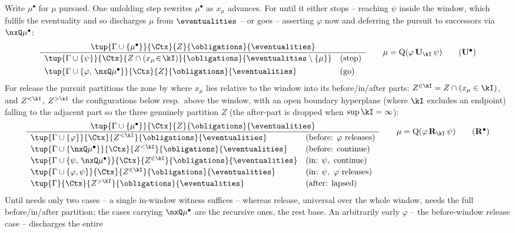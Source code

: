 Write $\mu^\bullet$ for $\mu$ {pursued}. One unfolding step rewrites $\mu^\bullet$ as $x_\mu$ advances.
For until it either {stops} -- reaching $\psi$ inside the window, which fulfils the eventuality and so
discharges $\mu$ from $\eventualities$ -- or {goes} -- asserting $\varphi$ now and deferring the pursuit
to successors via $\nxQ\mu^\bullet$:
\[
\frac{\tup{\Gamma\cup\{\mu^\bullet\}}{\Ctx}{Z}{\obligations}{\eventualities}}
{\begin{array}{ll}
\tup{\Gamma\cup\{\psi\}}{\Ctx}{Z\cap(x_\mu\!\in\!\kI)}{\obligations}{\eventualities\setminus\{\mu\}} & (\text{stop})\\[4pt]
\tup{\Gamma\cup\{\varphi,\,\nxQ\mu^\bullet\}}{\Ctx}{Z}{\obligations}{\eventualities} & (\text{go})
\end{array}}
\qquad \mu=\mathrm{Q}(\varphi\,\mathbf{U}_\kI\,\psi)
\tag{$\mathbf{U}^\bullet$}\label{tag:Uunf}
\]
For release the pursuit partitions the zone by where $x_\mu$ lies relative to the window into its
before/in/after parts: $Z^{\in\kI}=Z\cap(x_\mu\in\kI)$, and $Z^{<\kI}$, $Z^{>\kI}$ the configurations below
resp.\ above the window, with an open boundary hyperplane (where $\kI$ excludes an endpoint) falling to the
adjacent part so the three genuinely partition $Z$ (the after-part is dropped when $\sup\kI=\infty$):
\[
\frac{\tup{\Gamma\cup\{\mu^\bullet\}}{\Ctx}{Z}{\obligations}{\eventualities}}
{\begin{array}{ll}
\tup{\Gamma\cup\{\varphi\}}{\Ctx}{Z^{<\kI}}{\obligations}{\eventualities} & (\text{before: }\varphi\text{ releases})\\[2pt]
\tup{\Gamma\cup\{\nxQ\mu^\bullet\}}{\Ctx}{Z^{<\kI}}{\obligations}{\eventualities} & (\text{before: continue})\\[2pt]
\tup{\Gamma\cup\{\psi,\,\nxQ\mu^\bullet\}}{\Ctx}{Z^{\in\kI}}{\obligations}{\eventualities} & (\text{in: }\psi,\text{ continue})\\[2pt]
\tup{\Gamma\cup\{\varphi,\psi\}}{\Ctx}{Z^{\in\kI}}{\obligations}{\eventualities} & (\text{in: }\psi,\ \varphi\text{ releases})\\[2pt]
\tup{\Gamma}{\Ctx}{Z^{>\kI}}{\obligations}{\eventualities} & (\text{after: lapsed})
\end{array}}
\qquad \mu=\mathrm{Q}(\varphi\,\mathbf{R}_\kI\,\psi)
\tag{$\mathbf{R}^\bullet$}\label{tag:Runf}
\]
Until needs only two cases -- a single in-window witness suffices -- whereas release, universal over the whole
window, needs the full before/in/after partition; the cases carrying $\nxQ\mu^\bullet$ are the recursive ones,
the rest base. An arbitrarily early $\varphi$ -- the before-window release case -- discharges the {entire}
